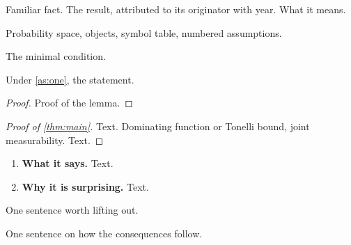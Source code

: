 \documentclass{saim-blog}
\begin{document}
\maketitle

\begin{tldr}
Familiar fact. The result, attributed to its originator with year. What it means.
\end{tldr}

\SecSetup
Probability space, objects, symbol table, numbered assumptions.

\begin{assumption}\label{as:one}
The minimal condition.
\end{assumption}

\SecResult
\begin{mainresult}
\begin{theorem}\label{thm:main}
Under \cref{as:one}, the statement.
\end{theorem}
\end{mainresult}

\SecProof
{}
\begin{proof}
Proof of the lemma.
\end{proof}

\begin{proof}[Proof of \cref{thm:main}]
 Text.
 Dominating function or Tonelli bound, joint measurability.
 Text.
\end{proof}

\SecInsight
\begin{enumerate}
\item \textbf{What it says.} Text.
\item \textbf{Why it is surprising.} Text.
\end{enumerate}

\begin{pullquote}
One sentence worth lifting out.
\end{pullquote}

\SecUses
One sentence on how the consequences follow.
\end{document}

